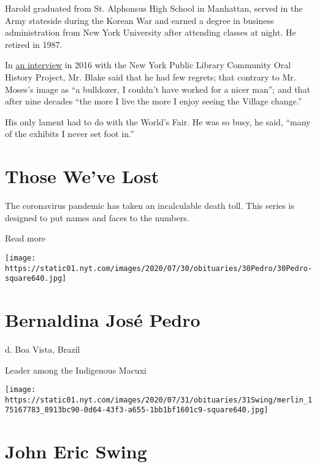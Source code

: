Harold graduated from St. Alphonsus High School in Manhattan, served in
the Army stateside during the Korean War and earned a degree in business
administration from New York University after attending classes at
night. He retired in 1987.

In \href{http://oralhistory.nypl.org/interviews/harold-blake-xvv7o2}{an
interview} in 2016 with the New York Public Library Community Oral
History Project, Mr. Blake said that he had few regrets; that contrary
to Mr. Moses's image as ``a bulldozer, I couldn't have worked for a
nicer man''; and that after nine decades ``the more I live the more I
enjoy seeing the Village change.''

His only lament had to do with the World's Fair. He was so busy, he
said, ``many of the exhibits I never set foot in.''

\href{https://www.nytimes.com/interactive/2020/obituaries/people-died-coronavirus-obituaries.html?action=click\&pgtype=Article\&state=default\&region=BELOW_MAIN_CONTENT\&context=covid_obits_promo}{}

\hypertarget{those-weve-lost}{%
\section{Those We've Lost}\label{those-weve-lost}}

The coronavirus pandemic has taken an incalculable death toll. This
series is designed to put names and faces to the numbers.

Read more

\texttt{[image: https://static01.nyt.com/images/2020/07/30/obituaries/30Pedro/30Pedro-square640.jpg]}

\hypertarget{bernaldina-josuxe9-pedro}{%
\section{Bernaldina José Pedro}\label{bernaldina-josuxe9-pedro}}

d. Boa Vista, Brazil

Leader among the Indigenous Macuxi

\texttt{[image: https://static01.nyt.com/images/2020/07/31/obituaries/31Swing/merlin\_175167783\_8913bc90-0d64-43f3-a655-1bb1bf1601c9-square640.jpg]}

\hypertarget{john-eric-swing}{%
\section{John Eric Swing}\label{john-eric-swing}}

